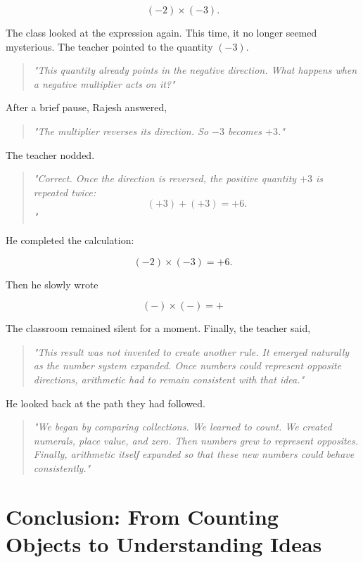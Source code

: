 \documentclass[11pt]{article}
\begin{document}
\[
(-2)\times(-3).
\]

The class looked at the expression again. This time, it no longer seemed mysterious. The teacher pointed to the quantity \((-3)\).

\begin{quote}
\emph{"This quantity already points in the negative direction. What happens when a negative multiplier acts on it?"}
\end{quote}

After a brief pause, Rajesh answered,

\begin{quote}
\emph{"The multiplier reverses its direction. So \(-3\) becomes \(+3\)."}
\end{quote}

The teacher nodded.

\begin{quote}
\emph{"Correct. Once the direction is reversed, the positive quantity \(+3\) is repeated twice:
\[
(+3)+(+3)=+6.
\]"}
\end{quote}

He completed the calculation:

\[
(-2)\times(-3)=+6.
\]

Then he slowly wrote

\[
\boxed{(-)\times(-)=+}
\]

The classroom remained silent for a moment. Finally, the teacher said,
\begin{quote}
\emph{"This result was not invented to create another rule. It emerged naturally as the number system expanded. Once numbers could represent opposite directions, arithmetic had to remain consistent with that idea."}
\end{quote}

He looked back at the path they had followed.

\begin{quote}
\emph{"We began by comparing collections. We learned to count. We created numerals, place value, and zero. Then numbers grew to represent opposites. Finally, arithmetic itself expanded so that these new numbers could behave consistently."}
\end{quote}

\section*{\textcolor{rose}{Conclusion: From Counting Objects to Understanding Ideas}}
\end{document}
